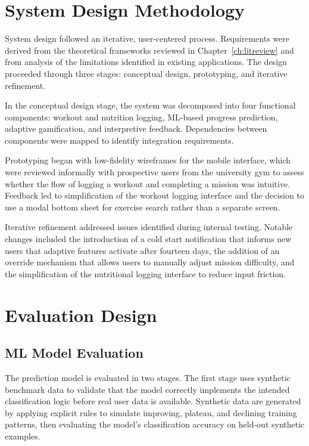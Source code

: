 \documentclass[12pt, a4paper]{report}
\begin{document}
\section{System Design Methodology}

System design followed an iterative, user-centered process. Requirements were derived from the theoretical frameworks reviewed in Chapter~\ref{ch:litreview} and from analysis of the limitations identified in existing applications. The design proceeded through three stages: conceptual design, prototyping, and iterative refinement.

In the conceptual design stage, the system was decomposed into four functional components: workout and nutrition logging, ML-based progress prediction, adaptive gamification, and interpretive feedback. Dependencies between components were mapped to identify integration requirements.

Prototyping began with low-fidelity wireframes for the mobile interface, which were reviewed informally with prospective users from the university gym to assess whether the flow of logging a workout and completing a mission was intuitive. Feedback led to simplification of the workout logging interface and the decision to use a modal bottom sheet for exercise search rather than a separate screen.

Iterative refinement addressed issues identified during internal testing. Notable changes included the introduction of a cold start notification that informs new users that adaptive features activate after fourteen days, the addition of an override mechanism that allows users to manually adjust mission difficulty, and the simplification of the nutritional logging interface to reduce input friction.

\section{Evaluation Design}

\subsection{ML Model Evaluation}

The prediction model is evaluated in two stages. The first stage uses synthetic benchmark data to validate that the model correctly implements the intended classification logic before real user data is available. Synthetic data are generated by applying explicit rules to simulate improving, plateau, and declining training patterns, then evaluating the model's classification accuracy on held-out synthetic examples.
\end{document}

